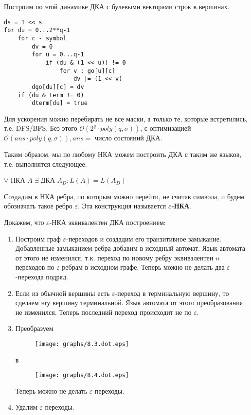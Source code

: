 Построим по этой динамике ДКА с булевыми векторами строк в вершинах.

\begin{verbatim}
ds = 1 << s
for du = 0...2**q-1
    for c - symbol
        dv = 0
        for u = 0...q-1
            if (du & (1 << u)) != 0
                for v : go[u][c]
                    dv |= (1 << v)
        dgo[du][c] = dv
    if (du & term != 0)
        dterm[du] = true
\end{verbatim}

Для ускорения можно перебирать не все маски, а только те, которые встретились, т.е. DFS/BFS. Без этого $\mathcal O(2^q\cdot poly(q, \sigma))$, с оптимизацией $\mathcal O(ans\cdot poly(q, \sigma)), ans=$ число состояний ДКА.

Таким образом, мы по любому НКА можем построить ДКА с таким же языков, т.е. выполнятся следующее:
\begin{theorem}
    $\forall$ НКА $A$ $\exists$ ДКА $A_D : L(A) = L(A_D)$
\end{theorem}

Создадим в НКА ребра, по которым можно перейти, не считав символа, и будем обозначать такое ребро $\varepsilon$. Эта конструкция называется \textbf{$\varepsilon$-НКА}.

Докажем, что $\varepsilon$-НКА эквивалентен ДКА построением:

\begin{enumerate}
    \item Построим граф $\varepsilon$-переходов и создадим его транзитивное замыкание. Добавленные замыканием ребра добавим в исходный автомат. Язык автомата от этого не изменился, т.к. переход по новому ребру эквивалентен $n$ переходов по $\varepsilon$-ребрам в исходном графе. Теперь можно не делать два $\varepsilon$-перехода подряд.
    \item Если из обычной вершины есть $\varepsilon$-переход в терминальную вершину, то сделаем эту вершину терминальной. Язык автомата от этого преобразования не изменился. Теперь последний переход происходит не по $\varepsilon$.

          \pagebreak

    \item Преобразуем \begin{figure}[h]
              \texttt{[image: graphs/8.3.dot.eps]}
          \end{figure}

          в

          \begin{figure}[h]
              \texttt{[image: graphs/8.4.dot.eps]}
          \end{figure}

          Теперь можно не делать $\varepsilon$-переходы.

    \item Удалим $\varepsilon$-переходы.
\end{enumerate}

